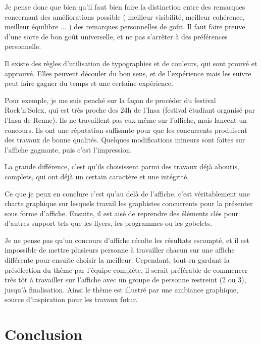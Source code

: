         Je pense donc que bien qu'il faut bien faire la distinction entre des remarques concernant des améliorations possible ( meilleur visibilité, meilleur cohérence, meilleur équilibre ... ) des remarques personnelles de goût.
        Il faut faire preuve d'une sorte de bon goût universelle, et ne pas s'arrêter à des préférences personnelle.
        
        Il existe des règles d'utilisation de typographies et de couleurs, qui sont prouvé et approuvé. Elles peuvent découler du bon sens, et de l'expérience mais les suivre peut faire gagner du temps et une certaine expérience.
        
        Pour exemple, je me suis penché sur la façon de procéder du festival Rock'n'Solex, qui est très proche des 24h de l'Insa (festival étudiant organisé par l'Insa de Renne).
        Ils ne travaillent pas eux-même sur l'affiche, mais lancent un concours. Ils ont une réputation suffisante pour que les concurrents produisent des travaux de bonne qualités.
        Quelques modifications mineurs sont faites sur l'affiche gagnante, puis c'est l'impression.
        
        La grande différence, c'est qu'ils choisissent parmi des travaux déjà aboutis, complets, qui ont déjà un certain caractère et une intégrité. 
        
        Ce que je peux en conclure c'est qu'au delà de l'affiche, c'est véritablement une charte graphique sur lesquels travail les graphistes concurrents pour la présenter sous forme d'affiche. Ensuite, il est aisé de reprendre des éléments clés pour d'autres support tels que les flyers, les programmes ou les gobelets.
        
        Je ne pense pas qu'un concours d'affiche récolte les résultats escompté, et il est impossible de mettre plusieurs personne à travailler chacun sur une affiche différente pour ensuite choisir la meilleur.
        Cependant, tout en gardant la présélection du thème par l'équipe complète, il serait préférable de commencer très tôt à travailler sur l'affiche avec un groupe de personne restreint (2 ou 3), jusqu'à finalisation. Ainsi le thème est illustré par une ambiance graphique, source d'inspiration pour les travaux futur.
        
        
\section{Conclusion}


